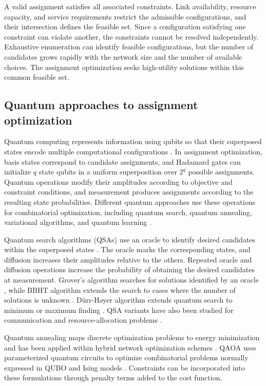 \documentclass[journal]{IEEEtran}
\begin{document}
{A valid assignment satisfies all associated constraints. Link availability, resource capacity, and service requirements restrict the admissible configurations, and their intersection defines the feasible set. Since a configuration satisfying one constraint can violate another, the constraints cannot be resolved independently. Exhaustive enumeration can identify feasible configurations, but the number of candidates grows rapidly with the network size and the number of available choices. The assignment optimization seeks high-utility solutions within this common feasible set.

\subsection{Quantum approaches to assignment optimization}
\label{sec:bg-quantum}

Quantum computing represents information using qubits so that their superposed states encode multiple computational configurations \cite{16,17}. In assignment optimization, basis states correspond to candidate assignments, and Hadamard gates can initialize $q$ state qubits in a uniform superposition over $2^q$ possible assignments. Quantum operations modify their amplitudes according to objective and constraint conditions, and measurement produces assignments according to the resulting state probabilities. Different quantum approaches use these operations for combinatorial optimization, including quantum search,
quantum annealing, variational algorithms, and quantum learning \cite{17,20,21,22}.

Quantum search algorithms (QSAs) use an oracle to identify desired candidates within the superposed states \cite{nielsen2011}. The oracle marks the corresponding states, and diffusion increases their amplitudes relative to the others. Repeated oracle and diffusion operations increase the probability of obtaining the desired candidates at measurement. Grover's algorithm searches for solutions identified by an oracle \cite{grover1996}, while BBHT algorithm extends the search to cases where the number of solutions is unknown \cite{boyer1998}. D\"urr-H\o yer algorithm extends quantum search to minimum or maximum finding \cite{durr1996}. QSA variants have also been studied for communication and resource-allocation problems \cite{botsinis2019}.

Quantum annealing maps discrete optimization problems to energy minimization and has been applied within hybrid network optimization schemes \cite{kadowaki1998,zhang2024tnse,wei2024tnse}. QAOA uses parameterized quantum circuits to optimize combinatorial problems normally expressed in QUBO and Ising models \cite{farhi2014,lucas2014}. Constraints can be incorporated into these formulations through penalty terms added to the cost function.

}
\end{document}
